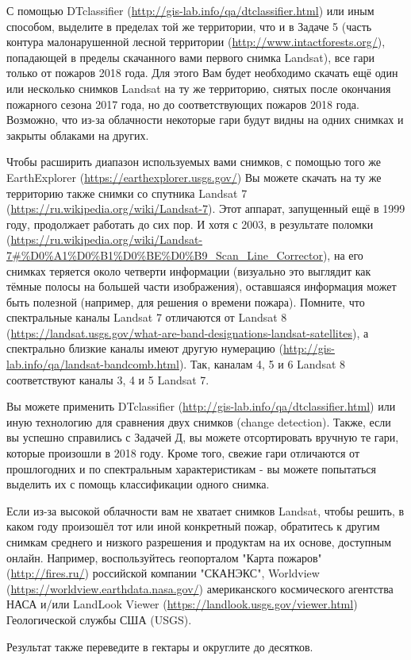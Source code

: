 
С помощью DTclassifier (\url{http://gis-lab.info/qa/dtclassifier.html}) или иным способом, выделите в 
пределах той же территории, 
что и в Задаче 5 (часть контура малонарушенной лесной территории (\url{http://www.intactforests.org/}), 
попадающей в пределы скачанного вами первого снимка Landsat), все гари только от пожаров 2018 года. Для этого Вам будет необходимо скачать ещё один или несколько снимков Landsat на ту же территорию, снятых после окончания пожарного сезона 2017 года, но до соответствующих пожаров 2018 года. Возможно, что из-за облачности некоторые гари будут видны на одних снимках и закрыты облаками на других.

Чтобы расширить диапазон используемых вами снимков, с помощью того же EarthExplorer (\url{https://earthexplorer.usgs.gov/}) 
Вы можете скачать на ту же территорию также снимки со спутника Landsat 7 (\url{https://ru.wikipedia.org/wiki/Landsat-7}). 
Этот аппарат, запущенный ещё в 1999 году, продолжает работать до сих пор. И хотя с 2003, в результате поломки (\url{https://ru.wikipedia.org/wiki/Landsat-7#%D0%A1%D0%B1%D0%BE%D0%B9_Scan_Line_Corrector}), 
на его снимках теряется около четверти информации (визуально это выглядит как тёмные полосы на большей 
части изображения), оставшаяся информация может быть полезной (например, для решения о времени пожара). 
Помните, что спектральные каналы Landsat 7 отличаются от Landsat 8 (\url{https://landsat.usgs.gov/what-are-band-designations-landsat-satellites}), 
а спектрально близкие каналы имеют другую нумерацию \linebreak (\url{http://gis-lab.info/qa/landsat-bandcomb.html}). Так, каналам 4, 5 и 6 Landsat 8 соответствуют каналы 3, 4 и 5 Landsat 7. 

Вы можете применить DTclassifier (\url{http://gis-lab.info/qa/dtclassifier.html}) или иную технологию для сравнения двух снимков (change detection). Также, если вы успешно справились с Задачей Д, вы можете отсортировать вручную те гари, которые произошли в 2018 году. Кроме того, свежие гари отличаются от прошлогодних и по спектральным характеристикам - вы можете попытаться выделить их с помощь классификации одного снимка.

Если из-за высокой облачности вам не хватает снимков Landsat, чтобы решить, в каком году произошёл 
тот или иной конкретный пожар, обратитесь к другим снимкам среднего и низкого разрешения и продуктам 
на их основе, доступным онлайн. Например, воспользуйтесь геопорталом "Карта пожаров" (\url{http://fires.ru/}) 
российской компании "СКАНЭКС", Worldview (\url{https://worldview.earthdata.nasa.gov/}) американского 
космического агентства НАСА и/или LandLook Viewer (\url{https://landlook.usgs.gov/viewer.html}) Геологической службы США (USGS). 

Результат также переведите в гектары и округлите до десятков.